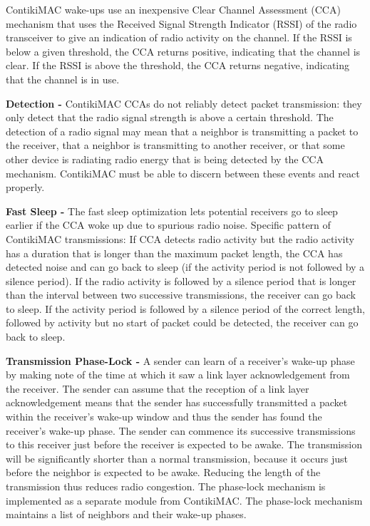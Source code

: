 ContikiMAC wake-ups use an inexpensive Clear Channel Assessment (CCA) mechanism that uses the Received Signal Strength Indicator (RSSI) of the radio transceiver to give an indication of radio activity on the channel. If the RSSI is below a given threshold, the CCA returns positive, indicating that the channel is clear. If the RSSI is above the threshold, the CCA returns negative, indicating that the channel is in use.

\textbf{Detection - }
ContikiMAC CCAs do not reliably detect packet transmission: they only detect that the radio signal strength is above a certain threshold. The detection of a radio signal may mean that a neighbor is transmitting a packet to the receiver, that a neighbor is transmitting to another receiver, or that some other device is radiating radio energy that is being detected by the CCA mechanism. ContikiMAC must be able to discern between these events and react properly.

\textbf{Fast Sleep - }
The fast sleep optimization lets potential receivers go to sleep earlier if the CCA woke up due to spurious radio noise. Specific pattern of ContikiMAC transmissions:
	If CCA detects radio activity but the radio activity has a duration that is longer than the maximum packet length, the CCA has detected noise and can go back to sleep (if the activity period is not followed by a silence period).
	If the radio activity is followed by a silence period that is longer than the interval between two successive transmissions, the receiver can go back to sleep.
	If the activity period is followed by a silence period of the correct length, followed by activity but no start of packet could be detected, the receiver can go back to sleep.
	
\textbf{Transmission Phase-Lock - }
A sender can learn of a receiver's wake-up phase by making note of the time at which it saw a link layer acknowledgement from the receiver. The sender can assume that the reception of a link layer acknowledgement means that the sender has successfully transmitted a packet within the receiver's wake-up window and thus the sender has found the receiver's wake-up phase. The sender can commence its successive transmissions to this receiver just before the receiver is expected to be awake. The transmission will be significantly shorter than a normal transmission, because it occurs just before the neighbor is expected to be awake. Reducing the length of the transmission thus reduces radio congestion.
	The phase-lock mechanism is implemented as a separate module from ContikiMAC.
	The phase-lock mechanism maintains a list of neighbors and their wake-up phases.
	
